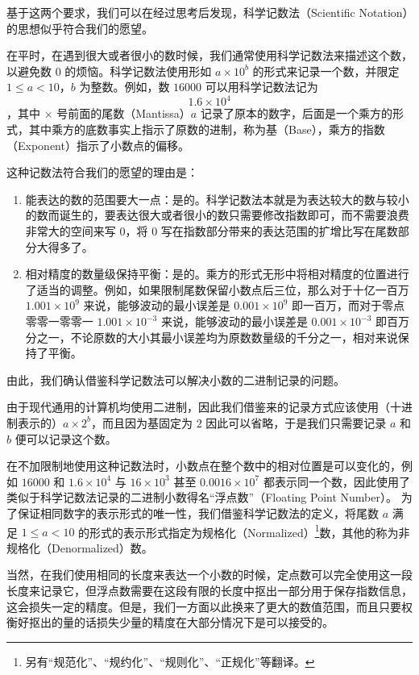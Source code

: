         基于这两个要求，我们可以在经过思考后发现，科学记数法（Scientific Notation）的思想似乎符合我们的愿望。

        在平时，在遇到很大或者很小的数时候，我们通常使用科学记数法来描述这个数，以避免数 $0$ 的烦恼。科学记数法使用形如 $a \times 10^b$ 的形式来记录一个数，并限定 $1 \leqslant a < 10 $，$b$ 为整数。例如，数 $16000$ 可以用科学记数法记为
        \[1.6 \times 10^4\]
        ，其中 $\times$ 号前面的尾数（Mantissa）$a$ 记录了原本的数字，后面是一个乘方的形式，其中乘方的底数事实上指示了原数的进制，称为基（Base），乘方的指数（Exponent）指示了小数点的偏移。

        这种记数法符合我们的愿望的理由是：
        \begin{enumerate}
            \item 能表达的数的范围要大一点：是的。科学记数法本就是为表达较大的数与较小的数而诞生的，要表达很大或者很小的数只需要修改指数即可，而不需要浪费非常大的空间来写 $0$，将 $0$ 写在指数部分带来的表达范围的扩增比写在尾数部分大得多了。
            \item 相对精度的数量级保持平衡：是的。乘方的形式无形中将相对精度的位置进行了适当的调整。例如，如果限制尾数保留小数点后三位，那么对于十亿一百万 $1.001 \times 10^9$ 来说，能够波动的最小误差是 $0.001 \times 10^9$ 即一百万，而对于零点零零一零零一 $1.001 \times 10^{-3}$ 来说，能够波动的最小误差是 $0.001 \times 10^{-3}$ 即百万分之一，不论原数的大小其最小误差均为原数数量级的千分之一，相对来说保持了平衡。
        \end{enumerate}

        由此，我们确认借鉴科学记数法可以解决小数的二进制记录的问题。

        由于现代通用的计算机均使用二进制，因此我们借鉴来的记录方式应该使用（十进制表示的）$a \times 2^b$，而且因为基固定为 $2$ 因此可以省略，于是我们只需要记录 $a$ 和 $b$ 便可以记录这个数。

        在不加限制地使用这种记数法时，小数点在整个数中的相对位置是可以变化的，例如 $16000$ 和 $1.6 \times 10^4$ 与 $16 \times 10^3$ 甚至 $0.0016 \times 10^7$ 都表示同一个数，因此使用了类似于科学记数法记录的二进制小数得名“浮点数”（Floating Point Number）。
        为了保证相同数字的表示形式的唯一性，我们借鉴科学记数法的定义，将尾数 $a$ 满足 $1 \leqslant a < 10$ 的形式的表示形式指定为规格化（Normalized）\footnote{另有“规范化”、“规约化”、“规则化”、“正规化”等翻译。}数，其他的称为非规格化（Denormalized）数。

        当然，在我们使用相同的长度来表达一个小数的时候，定点数可以完全使用这一段长度来记录它，但浮点数需要在这段有限的长度中抠出一部分用于保存指数信息，这会损失一定的精度。但是，我们一方面以此换来了更大的数值范围，而且只要权衡好抠出的量的话损失少量的精度在大部分情况下是可以接受的。
